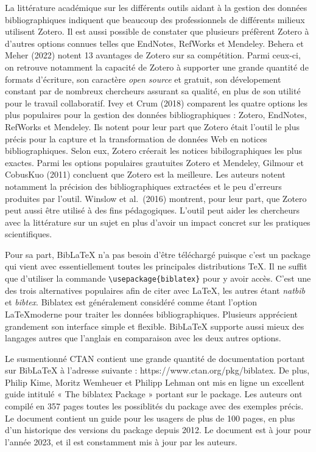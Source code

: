 \documentclass[
  letterpaper,
]{scrbook}
\begin{document}
La littérature académique sur les différents outils aidant à la gestion
des données bibliographiques indiquent que beaucoup des professionnels
de différents milieux utilisent Zotero. Il est aussi possible de
constater que plusieurs préfèrent Zotero à d'autres options connues
telles que EndNotes, RefWorks et Mendeley. Behera et Meher (2022) notent
13 avantages de Zotero sur sa compétition. Parmi ceux-ci, on retrouve
notamment la capacité de Zotero à supporter une grande quantité de
formats d'écriture, son caractère \emph{open source} et gratuit, son
dévelopement constant par de nombreux chercheurs assurant sa qualité, en
plus de son utilité pour le travail collaboratif. Ivey et Crum (2018)
comparent les quatre options les plus populaires pour la gestion des
données bibliographiques : Zotero, EndNotes, RefWorks et Mendeley. Ils
notent pour leur part que Zotero était l'outil le plus précis pour la
capture et la transformation de données Web en notices bibliographiques.
Selon eux, Zotero créerait les notices bibilographiques les plus
exactes. Parmi les options populaires grautuites Zotero et Mendeley,
Gilmour et CobusKuo (2011) concluent que Zotero est la meilleure. Les
auteurs notent notamment la précision des bibliographiques extractées et
le peu d'erreurs produites par l'outil. Winslow et al.~(2016) montrent,
pour leur part, que Zotero peut aussi être utilisé à des fins
pédagogiques. L'outil peut aider les chercheurs avec la littérature sur
un sujet en plus d'avoir un impact concret sur les pratiques
scientifiques.

Pour sa part, BibLaTeX n'a pas besoin d'être téléchargé puisque c'est un
package qui vient avec essentiellement toutes les principales
distributions TeX. Il ne suffit que d'utiliser la commande
\texttt{\textbackslash{}usepackage\{biblatex\}} pour y avoir accès.
C'est une des trois alternatives populaires afin de citer avec LaTeX,
les autres étant \emph{natbib} et \emph{bibtex}. Biblatex est
généralement considéré comme étant l'option \LaTeX moderne pour traiter
les données bibliographiques. Plusieurs apprécient grandement son
interface simple et flexible. BibLaTeX supporte aussi mieux des langages
autres que l'anglais en comparaison avec les deux autres options.

Le susmentionné CTAN contient une grande quantité de documentation
portant sur BibLaTeX à l'adresse suivante :
https://www.ctan.org/pkg/biblatex. De plus, Philip Kime, Moritz Wemheuer
et Philipp Lehman ont mis en ligne un excellent guide intitulé « The
biblatex Package » portant sur le package. Les auteurs ont compilé en
357 pages toutes les possiblités du package avec des exemples précis. Le
document contient un guide pour les usagers de plus de 100 pages, en
plus d'un historique des versions du package depuis 2012. Le document
est à jour pour l'année 2023, et il est constamment mis à jour par les
auteurs.
\end{document}

